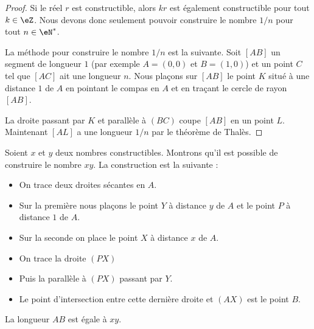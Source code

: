 \begin{proof}
    Si le réel \( r\) est constructible, alors \( kr\) est également constructible pour tout \( k\in \eZ\). Nous devons donc seulement pouvoir construire le nombre \( 1/n\) pour tout \( n\in \eN^*\).


    \begin{center}
   
    \end{center}

    La méthode pour construire le nombre \( 1/n\) est la suivante. Soit \( [AB]\) un segment de longueur \( 1\) (par exemple \( A=(0,0)\) et \( B=(1,0)\)) et un point \( C\) tel que \( [AC]\) ait une longueur \( n\). Nous plaçons sur \( [AB]\) le point \( K\) situé à une distance \( 1\) de \( A\) en pointant le compas en \( A\) et en traçant le cercle de rayon \( [AB]\).

    La droite passant par \( K\) et parallèle à \( (BC)\) coupe \( [AB]\) en un point \( L\). Maintenant \( [AL]\) a une longueur \( 1/n\) par le théorème de Thalès.

\end{proof}

\begin{example}    \label{ExGROooIosiBt}
    Soient \( x\) et \( y\) deux nombres constructibles. Montrons qu'il est possible de construire le nombre \( xy\). La construction est la suivante :

    \begin{center}
   
    \end{center}

    \begin{itemize}
        \item On trace deux droites sécantes en \( A\).
        \item Sur la première nous plaçons le point \( Y\) à distance \( y\) de \( A\) et le point \( P\) à distance \( 1\) de \( A\).
        \item Sur la seconde on place le point \( X\) à distance \( x\) de \( A\).
        \item On trace la droite \( (PX)\)
        \item Puis la parallèle à \( (PX)\) passant par \( Y\).
        \item Le point d'intersection entre cette dernière droite et $(AX)$ est le point \( B\).
    \end{itemize}
    La longueur \( AB\) est égale à \( xy\).
\end{example}

